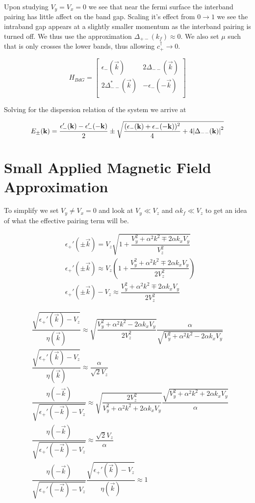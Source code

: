 Upon studying $V_y=V_x=0$ we see that near the fermi surface the interband pairing has little affect on the band gap. Scaling it's effect from $0 \to 1$ we see the intraband gap appears at a slightly smaller momentum as the interband pairing is turned off. We thus use the approximation $\Delta_{+-}(k_f) \approx 0$. We also set $\mu$ such that is only crosses the lower bands, thus allowing $c_+^{\dagger} \to 0$.

\begin{equation}
  H_{BdG} = 
  \begin{bmatrix}
    \epsilon_-(\vec{k}) & 2\Delta_{--}(\vec{k}) \\
    2\Delta_{--}^*(\vec{k}) & -\epsilon_-(-\vec{k}) \\
  \end{bmatrix}
\end{equation}

Solving for the dispersion relation of the system we arrive at

\begin{align}
  E_{\pm}(\mathbf{k}) = \dfrac{\epsilon_-'(\mathbf{k})-\epsilon_-'(-\mathbf{k})}{2} \pm \sqrt{\dfrac{(\epsilon_-(\mathbf{k})+\epsilon_-(-\mathbf{k}))^2}{4}+4\abs{\Delta_{--}(\mathbf{k})}^2}
\end{align}

\section{Small Applied Magnetic Field Approximation}

To simplify we set $V_y\neq V_x =0$ and look at $V_y\ll V_z$ and $\alpha k_f \ll V_z$ to get an idea of what the effective pairing term will be.

\begin{align}
  &\epsilon_+'(\pm\vec{k}) = V_z\sqrt{1+\dfrac{V_y^2+\alpha^2k^2\mp2\alpha k_xV_y}{V_z^2}} \\
  &\epsilon_+'(\pm\vec{k}) \approx V_z\left(1+\dfrac{V_y^2+\alpha^2k^2\mp2\alpha k_xV_y}{2V_z^2}\right) \\
  &\epsilon_+'(\pm\vec{k}) -V_z \approx \dfrac{V_y^2+\alpha^2k^2\mp2\alpha k_xV_y}{2V_z^2}
\end{align}

\begin{align}
  &\dfrac{\sqrt{\epsilon_+'(\vec{k}) -V_z}}{\eta(\vec{k})} \approx \sqrt{\dfrac{V_y^2+\alpha^2k^2-2\alpha k_xV_y}{2V_z^2}} \dfrac{\alpha}{\sqrt{V_y^2+\alpha^2k^2-2\alpha k_xV_y}} \\
  &\dfrac{\sqrt{\epsilon_+'(\vec{k}) -V_z}}{\eta(\vec{k})} \approx \dfrac{\alpha}{\sqrt{2}V_z} \\
  &\dfrac{\eta(-\vec{k})}{\sqrt{\epsilon_+'(-\vec{k}) -V_z}} \approx \sqrt{\dfrac{2V_z^2}{V_y^2+\alpha^2k^2+2\alpha k_xV_y}} \dfrac{\sqrt{V_y^2+\alpha^2k^2+2\alpha k_xV_y}}{\alpha} \\
  &\dfrac{\eta(-\vec{k})}{\sqrt{\epsilon_+'(-\vec{k}) -V_z}} \approx \dfrac{\sqrt{2}V_z}{\alpha} \\
  &\dfrac{\eta(-\vec{k})}{\sqrt{\epsilon_+'(-\vec{k}) -V_z}} \dfrac{\sqrt{\epsilon_+'(\vec{k}) -V_z}}{\eta(\vec{k})} \approx 1
\end{align}

